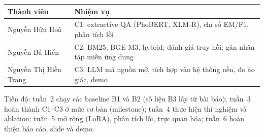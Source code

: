 \documentclass[11pt]{article}
\begin{document}
\begin{table}[h]
\centering\small
\begin{tabular}{@{}>{\raggedright\arraybackslash}p{}>{\raggedright\arraybackslash}p{}@{}}
\toprule
\textbf{Thành viên} & \textbf{Nhiệm vụ} \\
\midrule
Nguyễn Hữu Hoà & C1: extractive QA (PhoBERT, XLM-R), chỉ số EM/F1, phân tích lỗi \\
Nguyễn Bá Hiển & C2: BM25, BGE-M3, hybrid; đánh giá truy hồi; gán nhãn tập miền ứng dụng \\
Nguyễn Thị Hiền Trang & C3: LLM mã nguồn mở, tích hợp vào hệ thống nền, đo ảo giác, demo \\
\bottomrule
\end{tabular}
\end{table}

Tiến độ: tuần~2 chạy các baseline B1 và B2 (số liệu B3 lấy từ bài báo); tuần~3 hoàn thành C1--C3 ở mức cơ bản (milestone); tuần~4 thực hiện thí nghiệm và ablation; tuần~5 mở rộng (LoRA), phân tích lỗi, trực quan hóa; tuần~6 hoàn thiện báo cáo, slide và demo.


\end{document}
